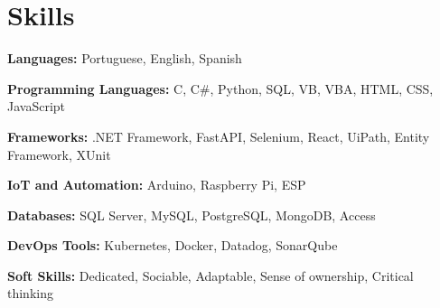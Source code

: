 \section{Skills}
	\begin{SkillHighlights} %
		\item \textbf{Languages:} Portuguese, English, Spanish
		\item \textbf{Programming Languages:} C, C\#, Python, SQL, VB, VBA, HTML, CSS, JavaScript
		\item \textbf{Frameworks:} .NET Framework, FastAPI, Selenium, React, UiPath, Entity Framework, XUnit
		\item \textbf{IoT and Automation:} Arduino, Raspberry Pi, ESP
				
		\switchcolumn %
		
		\item \textbf{Databases:} SQL Server, MySQL, PostgreSQL, MongoDB, Access		
		\item \textbf{DevOps Tools:} Kubernetes, Docker, Datadog, SonarQube
		\item \textbf{Soft Skills:} Dedicated, Sociable, Adaptable, Sense of ownership, Critical thinking
	\end{SkillHighlights}